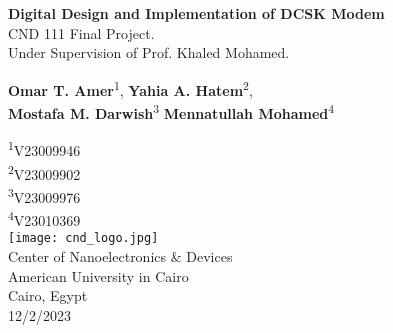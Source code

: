 \begin{titlepage}
    \begin{center}
        \Huge
        \textbf{Digital Design and Implementation of DCSK Modem}\\

        \Large
        \vspace*{0.5cm}
        CND 111 Final Project.\\Under Supervision of Prof. Khaled Mohamed.

        \vspace*{2cm}
        \textbf{Omar T. Amer}\textsuperscript{1}, \textbf{Yahia A. Hatem}\textsuperscript{2},\\\textbf{Mostafa M. Darwish}\textsuperscript{3} \textbf{Mennatullah Mohamed}\textsuperscript{4}

        \vspace*{1cm}
        \textsuperscript{1}{V23009946}\\
        \textsuperscript{2}{V23009902}\\
        \textsuperscript{3}{V23009976}\\
        \textsuperscript{4}{V23010369}\\
        \vfill
        \texttt{[image: cnd\_logo.jpg]}\\
        \large
        Center of Nanoelectronics \& Devices\\
        American University in Cairo\\
        Cairo, Egypt\\
        12/2/2023
    \end{center}
\end{titlepage}